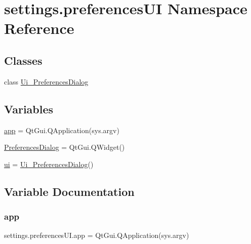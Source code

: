 \hypertarget{namespacesettings_1_1preferences_u_i}{}\section{settings.\+preferences\+UI Namespace Reference}
\label{namespacesettings_1_1preferences_u_i}
\subsection*{Classes}
\begin{DoxyCompactItemize}
\item 
class \hyperlink{classsettings_1_1preferences_u_i_1_1_ui___preferences_dialog}{Ui\+\_\+\+Preferences\+Dialog}
\end{DoxyCompactItemize}
\subsection*{Variables}
\begin{DoxyCompactItemize}
\item 
\hyperlink{namespacesettings_1_1preferences_u_i_a827bf1bd672334a2a55713a2a33e610d}{app} = Qt\+Gui.\+Q\+Application(sys.\+argv)
\item 
\hyperlink{namespacesettings_1_1preferences_u_i_a70162ca377a00273f0795162093f7958}{Preferences\+Dialog} = Qt\+Gui.\+Q\+Widget()
\item 
\hyperlink{namespacesettings_1_1preferences_u_i_ae448bdbd0fb6bba061e4735237500ea5}{ui} = \hyperlink{classsettings_1_1preferences_u_i_1_1_ui___preferences_dialog}{Ui\+\_\+\+Preferences\+Dialog}()
\end{DoxyCompactItemize}


\subsection{Variable Documentation}
\hypertarget{namespacesettings_1_1preferences_u_i_a827bf1bd672334a2a55713a2a33e610d}{}\label{namespacesettings_1_1preferences_u_i_a827bf1bd672334a2a55713a2a33e610d} 
\subsubsection{\texorpdfstring{app}{app}}
{\footnotesize\ttfamily settings.\+preferences\+U\+I.\+app = Qt\+Gui.\+Q\+Application(sys.\+argv)}

